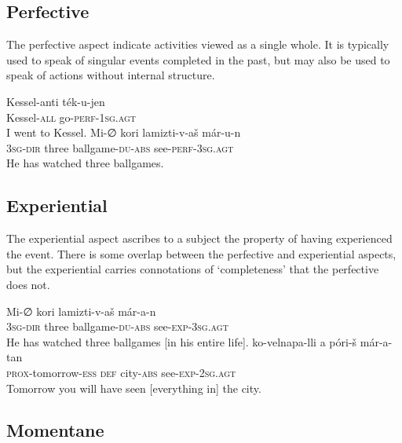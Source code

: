 \documentclass[grammar]{subfiles}
\begin{document}
\subsection{Perfective}
\label{vp:ssec_perfective}

The perfective aspect indicate activities viewed as a single whole.  It is
typically used to speak of singular events completed in the past, but may also
be used to speak of actions without internal structure.

\begin{exe}
  \ex {}
  \gll Kessel-anti ték-u-jen\\
  Kessel\textsc{-all} go\textsc{-perf-1sg.agt}\\
  \glt I went to Kessel.
  \ex {}
  \gll Mi-∅ kori lamizti-v-aš már-u-n\\ 
  \textsc{3sg-dir} three ballgame\textsc{-du-abs} see\textsc{-perf-3sg.agt}\\
  \glt He has watched three ballgames.
\end{exe}



\subsection{Experiential}
\label{vp:ssec_experiential}

The experiential aspect ascribes to a subject the property of having
experienced the event.  There is some overlap between the perfective and
experiential aspects, but the experiential carries connotations of
‘completeness’ that the perfective does not.   

\begin{exe}
  \ex {}
  \gll Mi-∅ kori lamizti-v-aš már-a-n\\ 
  \textsc{3sg-dir} three ballgame\textsc{-du-abs} see\textsc{-exp-3sg.agt}\\
  \glt He has watched three ballgames [in his entire life].
  \ex {}
  \gll ko-velnapa-lli a póri-š már-a-tan\\
  \textsc{prox}-tomorrow-\textsc{ess} \textsc{def} city\textsc{-abs} see\textsc{-exp-2sg.agt}\\
  \glt Tomorrow you will have seen [everything in] the city.
\end{exe}

\subsection{Momentane}
\label{vp:ssec_momentane}
\end{document}
